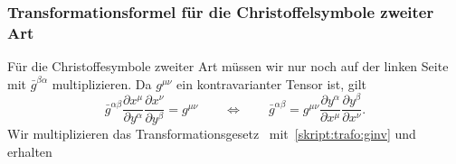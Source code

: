 \subsubsection{Transformationsformel für die Christoffelsymbole zweiter Art}
Für die Christoffesymbole zweiter Art müssen wir nur noch auf der
linken Seite mit $\bar g^{\beta\alpha}$ multiplizieren.
Da $g^{\mu\nu}$ ein kontravarianter Tensor ist, gilt
\begin{equation}
\bar g^{\alpha\beta}
\frac{\partial x^\mu}{\partial y^\alpha}
\frac{\partial x^\nu}{\partial y^\beta}
=
g^{\mu\nu}
\qquad\Leftrightarrow\qquad
\bar g^{\alpha\beta}
=
g^{\mu\nu}
\frac{\partial y^\alpha}{\partial x^\mu}
\frac{\partial y^\beta}{\partial x^\nu}.
\label{skript:trafo:ginv}
\end{equation}
Wir multiplizieren das Transformationsgesetz~\label{skript:trafo:chr1}
mit~\eqref{skript:trafo:ginv} und erhalten
